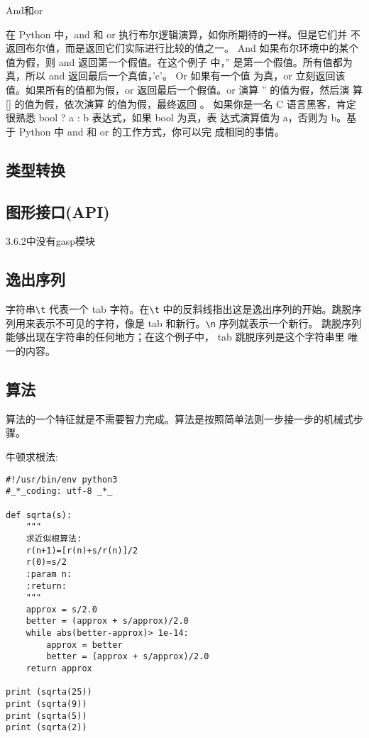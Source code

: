 \documentclass[twoside,11pt]{book}
\begin{document}
And和or

在 Python 中，and 和 or 执行布尔逻辑演算，如你所期待的一样。但是它们并 不返回布尔值，而是返回它们实际进行比较的值之一。
And 如果布尔环境中的某个值为假，则 and 返回第一个假值。在这个例子 中，'' 是第一个假值。所有值都为真，所以 and 返回最后一个真值，'c'。
Or 如果有一个值 为真，or 立刻返回该值。如果所有的值都为假，or 返回最后一个假值。or 演算 '' 的值为假，然后演 算 [] 的值为假，依次演算 {} 的值为假，最终返回 {} 。
如果你是一名 C 语言黑客，肯定很熟悉 bool ? a : b 表达式，如果 bool 为真，表 达式演算值为 a，否则为 b。基于 Python 中 and 和 or 的工作方式，你可以完 成相同的事情。


\subsection{类型转换}

\subsection{图形接口(API)}
3.6.2中没有gasp模块




\subsection{逸出序列}
字符串\lstinline!\t! 代表一个 tab 字符。在\lstinline!\t! 中的反斜线指出这是逸出序列的开始。跳脱序
列用来表示不可见的字符，像是 tab 和新行。\lstinline!\n! 序列就表示一个新行。
跳脱序列能够出现在字符串的任何地方；在这个例子中， tab 跳脱序列是这个字符串里
唯一的内容。

\subsection{算法}

算法的一个特征就是不需要智力完成。算法是按照简单法则一步接一步的机械式步骤。

牛顿求根法:
\begin{lstlisting}
#!/usr/bin/env python3
#_*_coding: utf-8 _*_

def sqrta(s):
    """
    求近似根算法:
    r(n+1)=[r(n)+s/r(n)]/2
    r(0)=s/2
    :param n:
    :return:
    """
    approx = s/2.0
    better = (approx + s/approx)/2.0
    while abs(better-approx)> 1e-14:
        approx = better
        better = (approx + s/approx)/2.0
    return approx

print (sqrta(25))
print (sqrta(9))
print (sqrta(5))
print (sqrta(2))
\end{lstlisting}
\end{document}
